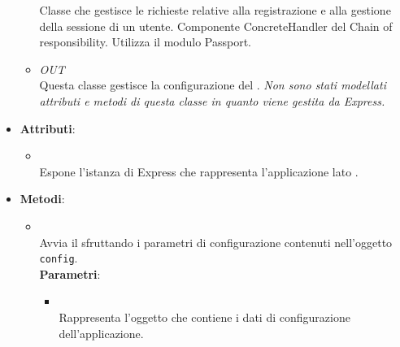 \begin{itemize}
\begin{itemize}
Classe che gestisce le richieste relative alla registrazione e alla gestione della sessione di un utente. Componente ConcreteHandler del  Chain of responsibility. Utilizza il modulo Passport.
\item \textit{OUT} \hyperref[\nogloxy{Premi::Back-End::Config::Config}]{}\\
Questa classe gestisce la configurazione del . \textit{Non sono stati modellati attributi e metodi di questa classe in quanto viene gestita da Express.}
\end{itemize}
\item \textbf{Attributi}:
\begin{itemize}
\item {}
\\ Espone l'istanza di Express che rappresenta l'applicazione lato .
\end{itemize}
\item \textbf{Metodi}:
\begin{itemize}
\item {}
\\ Avvia il  sfruttando i parametri di configurazione contenuti nell'oggetto \texttt{config}.
\\ \textbf{Parametri}:
\begin{itemize}
\item {}
\\ Rappresenta l'oggetto che contiene i dati di configurazione dell'applicazione.
\end{itemize}
\end{itemize}
\end{itemize}
\subsection{}
\label{\nogloxy{Premi::Back-End::App}}
